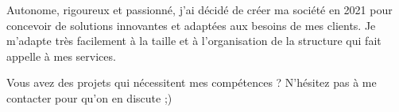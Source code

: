 

\begin{cvparagraph}

Autonome, rigoureux et passionné, j'ai décidé de créer ma société en 2021 pour concevoir de solutions innovantes et adaptées aux besoins de mes clients. Je m'adapte très facilement à la taille et à l'organisation de la structure qui fait appelle à mes services.


Vous avez des projets qui nécessitent mes compétences ? N'hésitez pas à me contacter pour qu'on en discute ;)
\end{cvparagraph}
